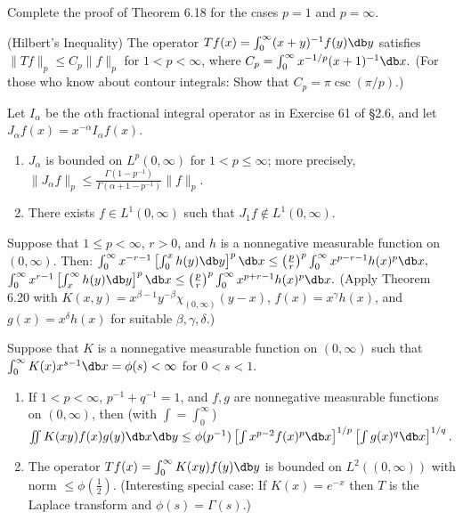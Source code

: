 \documentclass[12pt, a4paper]{article}
\begin{document}
\begin{problem}\label{prob:6-26}
Complete the proof of Theorem 6.18 for the cases $p=1$ and $p=\infty.$
\end{problem}

\begin{problem}\label{prob:6-27}
(Hilbert's Inequality) The operator $Tf(x)=\int_{0}^{\infty}(x+y)^{-1}f(y)\db y$ satisfies $\|Tf\|_{p}\le C_{p}\|f\|_{p}$ for $1<p<\infty$, where $C_{p}=\int_{0}^{\infty}x^{-1/p}(x+1)^{-1}\db x.$ (For those who know about contour integrals: Show that $C_{p}=\pi\csc(\pi/p)$.)
\end{problem}

\begin{problem}\label{prob:6-28}
Let $I_{\alpha}$ be the $\alpha$th fractional integral operator as in Exercise 61 of \S 2.6, and let $J_{\alpha}f(x)=x^{-\alpha}I_{\alpha}f(x)$.
\begin{enumerate}[label=\alph*.]
\item $J_{\alpha}$ is bounded on $L^{p}(0,\infty)$ for $1<p\le\infty$; more precisely, $\|J_{\alpha}f\|_{p}\le\frac{\Gamma(1-p^{-1})}{\Gamma(\alpha+1-p^{-1})}\|f\|_{p}.$
\item There exists $f\in L^{1}(0,\infty)$ such that $J_{1}f\notin L^{1}(0,\infty)$.
\end{enumerate}
\end{problem}

\begin{problem}\label{prob:6-29}
Suppose that $1\le p<\infty$, $r>0$, and $h$ is a nonnegative measurable function on $(0,\infty)$. Then:
$\int_{0}^{\infty}x^{-r-1}\left[\int_{0}^{x}h(y)\db y\right]^{p}\db x\le\left(\frac{p}{r}\right)^{p}\int_{0}^{\infty}x^{p-r-1}h(x)^{p}\db x,$
$\int_{0}^{\infty}x^{r-1}\left[\int_{x}^{\infty}h(y)\db y\right]^{p}\db x\le\left(\frac{p}{r}\right)^{p}\int_{0}^{\infty}x^{p+r-1}h(x)^{p}\db x.$
(Apply Theorem 6.20 with $K(x,y)=x^{\beta-1}y^{-\beta}\chi_{(0,\infty)}(y-x)$, $f(x)=x^{\gamma}h(x)$, and $g(x)=x^{\delta}h(x)$ for suitable $\beta, \gamma, \delta$.)
\end{problem}

\begin{problem}\label{prob:6-30}
Suppose that $K$ is a nonnegative measurable function on $(0,\infty)$ such that $\int_{0}^{\infty}K(x)x^{s-1}\db x=\phi(s)<\infty$ for $0<s<1$.
\begin{enumerate}[label=\alph*.]
\item If $1<p<\infty$, $p^{-1}+q^{-1}=1$, and $f,g$ are nonnegative measurable functions on $(0,\infty)$, then (with $\int=\int_{0}^{\infty}$)
$\iint K(xy)f(x)g(y)\db x\db y\le\phi(p^{-1})\left[\int x^{p-2}f(x)^{p}\db x\right]^{1/p}\left[\int g(x)^{q}\db x\right]^{1/q}.$
\item The operator $Tf(x)=\int_{0}^{\infty}K(xy)f(y)\db y$ is bounded on $L^{2}((0,\infty))$ with norm $\le\phi(\frac{1}{2})$. (Interesting special case: If $K(x)=e^{-x}$ then $T$ is the Laplace transform and $\phi(s)=\Gamma(s)$.)
\end{enumerate}
\end{problem}
\end{document}
